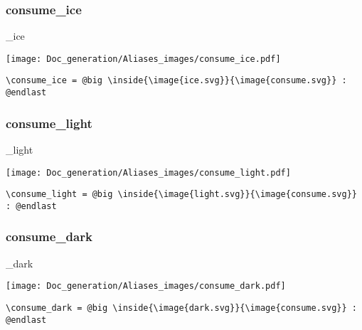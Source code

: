 \documentclass{article}
\begin{document}
\subsubsection{consume\_ice}
\begin{minipage}{0.45\linewidth}
\raggedright
\begin{spverbatim}
\consume_ice 
\end{spverbatim}
\end{minipage}
\begin{minipage}{0.45\linewidth}
\raggedleft
\texttt{[image: Doc\_generation/Aliases\_images/consume\_ice.pdf]}
\end{minipage}
\begin{center}
\begin{BVerbatim}
\consume_ice = @big \inside{\image{ice.svg}}{\image{consume.svg}} : @endlast
\end{BVerbatim}
\end{center}

\subsubsection{consume\_light}
\begin{minipage}{0.45\linewidth}
\raggedright
\begin{spverbatim}
\consume_light 
\end{spverbatim}
\end{minipage}
\begin{minipage}{0.45\linewidth}
\raggedleft
\texttt{[image: Doc\_generation/Aliases\_images/consume\_light.pdf]}
\end{minipage}
\begin{center}
\begin{BVerbatim}
\consume_light = @big \inside{\image{light.svg}}{\image{consume.svg}} : @endlast
\end{BVerbatim}
\end{center}

\subsubsection{consume\_dark}
\begin{minipage}{0.45\linewidth}
\raggedright
\begin{spverbatim}
\consume_dark 
\end{spverbatim}
\end{minipage}
\begin{minipage}{0.45\linewidth}
\raggedleft
\texttt{[image: Doc\_generation/Aliases\_images/consume\_dark.pdf]}
\end{minipage}
\begin{center}
\begin{BVerbatim}
\consume_dark = @big \inside{\image{dark.svg}}{\image{consume.svg}} : @endlast
\end{BVerbatim}
\end{center}
\end{document}
